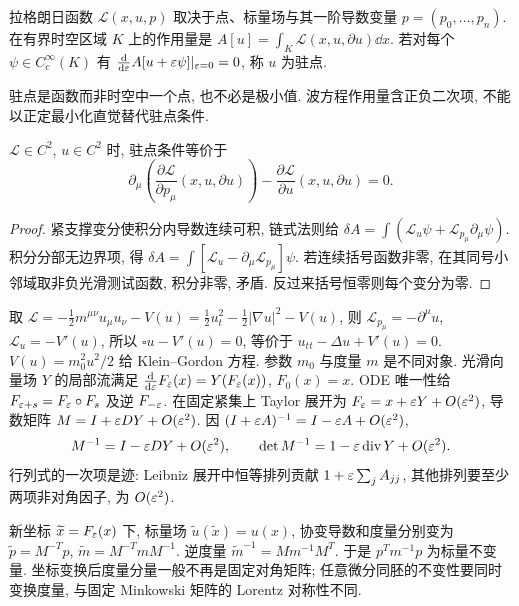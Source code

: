 \label{ch:lagrangian}
\begin{definition}
拉格朗日函数 $\mathcal L(x,u,p)$ 取决于点、标量场与其一阶导数变量 $p=(p_0,\ldots,p_n)$. 在有界时空区域 $K$ 上的作用量是 $A[u]=\int_K\mathcal L(x,u,\partial u)\dd x$. 若对每个 $\psi\in C_c^\infty(K)$ 有 $\frac{\mathrm d}{\mathrm d\varepsilon}A[u+\varepsilon\psi]|_{\varepsilon=0}=0$, 称 $u$ 为驻点.
\end{definition}
驻点是函数而非时空中一个点, 也不必是极小值. 波方程作用量含正负二次项, 不能以正定最小化直觉替代驻点条件.
\begin{theorem}\label{thm:EL}
$\mathcal L\in C^2$, $u\in C^2$ 时, 驻点条件等价于
\[
\partial_\mu\left(\frac{\partial\mathcal L}{\partial p_\mu}(x,u,\partial u)\right)
-\frac{\partial\mathcal L}{\partial u}(x,u,\partial u)=0.
\]
\end{theorem}
\begin{proof}
紧支撑变分使积分内导数连续可积, 链式法则给 $\delta A=\int(\mathcal L_u\psi+\mathcal L_{p_\mu}\partial_\mu\psi)$. 积分分部无边界项, 得 $\delta A=\int[\mathcal L_u-\partial_\mu\mathcal L_{p_\mu}]\psi$. 若连续括号函数非零, 在其同号小邻域取非负光滑测试函数, 积分非零, 矛盾. 反过来括号恒零则每个变分为零.
\end{proof}
取 $\mathcal L=-\tfrac12m^{\mu\nu}u_\mu u_\nu-V(u)=\tfrac12u_t^2-\tfrac12|\nabla u|^2-V(u)$, 则 $\mathcal L_{p_\mu}=-\partial^\mu u$, $\mathcal L_u=-V'(u)$, 所以 $\square u-V'(u)=0$, 等价于 $u_{tt}-\Delta u+V'(u)=0$. $V(u)=m_0^2u^2/2$ 给 Klein--Gordon 方程. 参数 $m_0$ 与度量 $m$ 是不同对象.
光滑向量场 $Y$ 的局部流满足 $\frac{\mathrm d}{\mathrm d\varepsilon}F_\varepsilon(x)=Y(F_\varepsilon(x))$, $F_0(x)=x$. ODE 唯一性给 $F_{\varepsilon+s}=F_\varepsilon\circ F_s$ 及逆 $F_{-\varepsilon}$. 在固定紧集上 Taylor 展开为 $F_\varepsilon=x+\varepsilon Y+O(\varepsilon^2)$, 导数矩阵 $M=I+\varepsilon DY+O(\varepsilon^2)$. 因 $(I+\varepsilon A)^{-1}=I-\varepsilon A+O(\varepsilon^2)$,
\[
M^{-1}=I-\varepsilon DY+O(\varepsilon^2),\qquad \det M^{-1}=1-\varepsilon\operatorname{div} Y+O(\varepsilon^2).
\]
行列式的一次项是迹: Leibniz 展开中恒等排列贡献 $1+\varepsilon\sum_jA_{jj}$, 其他排列要至少两项非对角因子, 为 $O(\varepsilon^2)$.

新坐标 $\widetilde x=F_\varepsilon(x)$ 下, 标量场 $\widetilde u(\widetilde x)=u(x)$, 协变导数和度量分别变为 $\widetilde p=M^{-T}p$, $\widetilde m=M^{-T}mM^{-1}$. 逆度量 $\widetilde m^{-1}=Mm^{-1}M^T$. 于是 $p^Tm^{-1}p$ 为标量不变量. 坐标变换后度量分量一般不再是固定对角矩阵; 任意微分同胚的不变性要同时变换度量, 与固定 Minkowski 矩阵的 Lorentz 对称性不同.

